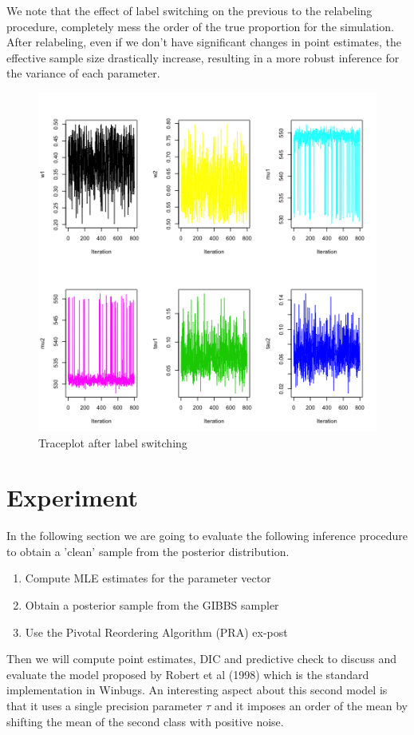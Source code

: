 \documentclass{article}
\begin{document}
We note that the effect of label switching on the previous to the relabeling procedure, completely mess the order of the true proportion for the simulation. After relabeling, even if we don't have significant changes in point estimates, the effective sample size drastically increase, resulting in a more robust inference for the variance of each parameter.

\begin{figure}[h!]
    \centering
    \includegraphics[width=.7\textwidth]{plot_4.png}
    \caption{Traceplot after label switching}
    \label{Monkey measurement}
\end{figure}

\section{Experiment}
In the following section we are going to evaluate the following inference procedure to obtain a 'clean' sample from the posterior distribution.
\begin{enumerate}
\item Compute MLE estimates for the parameter vector
\item Obtain a posterior sample from the GIBBS sampler
\item Use the Pivotal Reordering Algorithm (PRA) ex-post
\end{enumerate}
Then we will compute point estimates, DIC and predictive check to discuss and evaluate the model proposed by Robert et al (1998) which is the standard implementation in Winbugs. An interesting aspect about this second model is that it uses a single precision parameter $\tau$ and it imposes an order of the mean by shifting the mean of the second class with positive noise.
\end{document}
